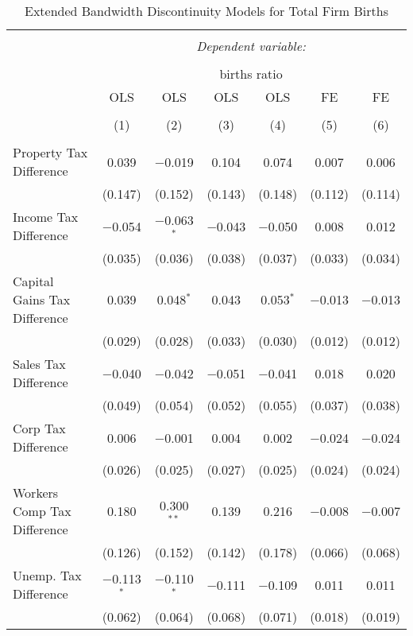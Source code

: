 
\begin{table}[!htbp] \centering 
  \caption{Extended Bandwidth Discontinuity Models for  Total Firm Births} 
  \label{--eb} 
\begin{tabular}{@{\extracolsep{5pt}}lcccccc} 
\\[-1.8ex]\hline 
\hline \\[-1.8ex] 
 & \multicolumn{6}{c}{\textit{Dependent variable:}} \\ 
\cline{2-7} 
\\[-1.8ex] & \multicolumn{6}{c}{births ratio} \\ 
 & OLS & OLS & OLS & OLS & FE & FE \\ 
\\[-1.8ex] & (1) & (2) & (3) & (4) & (5) & (6)\\ 
\hline \\[-1.8ex] 
 Property Tax Difference & 0.039 & $-$0.019 & 0.104 & 0.074 & 0.007 & 0.006 \\ 
  & (0.147) & (0.152) & (0.143) & (0.148) & (0.112) & (0.114) \\ 
  Income Tax Difference & $-$0.054 & $-$0.063$^{*}$ & $-$0.043 & $-$0.050 & 0.008 & 0.012 \\ 
  & (0.035) & (0.036) & (0.038) & (0.037) & (0.033) & (0.034) \\ 
  Capital Gains Tax Difference & 0.039 & 0.048$^{*}$ & 0.043 & 0.053$^{*}$ & $-$0.013 & $-$0.013 \\ 
  & (0.029) & (0.028) & (0.033) & (0.030) & (0.012) & (0.012) \\ 
  Sales Tax Difference & $-$0.040 & $-$0.042 & $-$0.051 & $-$0.041 & 0.018 & 0.020 \\ 
  & (0.049) & (0.054) & (0.052) & (0.055) & (0.037) & (0.038) \\ 
  Corp Tax Difference & 0.006 & $-$0.001 & 0.004 & 0.002 & $-$0.024 & $-$0.024 \\ 
  & (0.026) & (0.025) & (0.027) & (0.025) & (0.024) & (0.024) \\ 
  Workers Comp Tax Difference & 0.180 & 0.300$^{**}$ & 0.139 & 0.216 & $-$0.008 & $-$0.007 \\ 
  & (0.126) & (0.152) & (0.142) & (0.178) & (0.066) & (0.068) \\ 
  Unemp. Tax Difference & $-$0.113$^{*}$ & $-$0.110$^{*}$ & $-$0.111 & $-$0.109 & 0.011 & 0.011 \\ 
  & (0.062) & (0.064) & (0.068) & (0.071) & (0.018) & (0.019) \\ 

\end{tabular}
\end{table}
